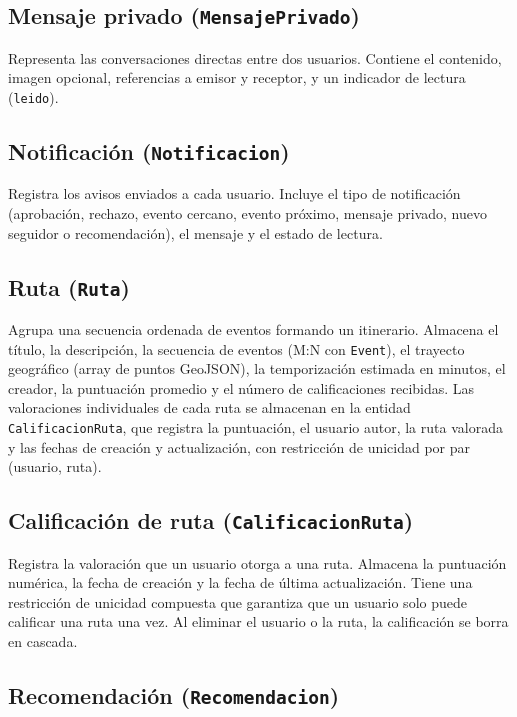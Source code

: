 \subsection{Mensaje privado (\texttt{MensajePrivado})}

Representa las conversaciones directas entre dos usuarios. Contiene el contenido, imagen opcional, referencias a emisor y receptor, y un indicador de lectura (\texttt{leido}).

\subsection{Notificación (\texttt{Notificacion})}

Registra los avisos enviados a cada usuario. Incluye el tipo de notificación (aprobación, rechazo, evento cercano, evento próximo, mensaje privado, nuevo seguidor o recomendación), el mensaje y el estado de lectura.

\subsection{Ruta (\texttt{Ruta})}

Agrupa una secuencia ordenada de eventos formando un itinerario. Almacena el título, la descripción, la secuencia de eventos (M:N con \texttt{Event}), el trayecto geográfico (array de puntos GeoJSON), la temporización estimada en minutos, el creador, la puntuación promedio y el número de calificaciones recibidas. Las valoraciones individuales de cada ruta se almacenan en la entidad \texttt{CalificacionRuta}, que registra la puntuación, el usuario autor, la ruta valorada y las fechas de creación y actualización, con restricción de unicidad por par (usuario, ruta).

\subsection{Calificación de ruta (\texttt{CalificacionRuta})}

Registra la valoración que un usuario otorga a una ruta. Almacena la puntuación numérica, la fecha de creación y la fecha de última actualización. Tiene una restricción de unicidad compuesta que garantiza que un usuario solo puede calificar una ruta una vez. Al eliminar el usuario o la ruta, la calificación se borra en cascada.

\subsection{Recomendación (\texttt{Recomendacion})}

